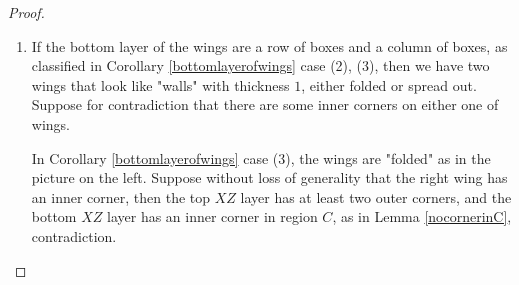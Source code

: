 \documentclass{amsart}[10pt]
\theoremstyle{plain}
\theoremstyle{definition}
\begin{document}
\begin{proof}
\begin{enumerate}









\item 
If the bottom layer of the wings are a row of boxes and a column of boxes, as classified in Corollary \ref{bottomlayerofwings} case (2), (3), then we have two wings that look like "walls" with thickness $1$, either folded or spread out. Suppose for contradiction that there are some inner corners on either one of wings. 

In Corollary \ref{bottomlayerofwings} case (3), the wings are "folded" as in the picture on the left. Suppose without loss of generality that the right wing has an inner corner, then the top $XZ$ layer has at least two outer corners, and the bottom $XZ$ layer has an inner corner in region $C$, as in Lemma \ref{nocornerinC}, contradiction.


\end{enumerate}
\end{proof}
\end{document}
